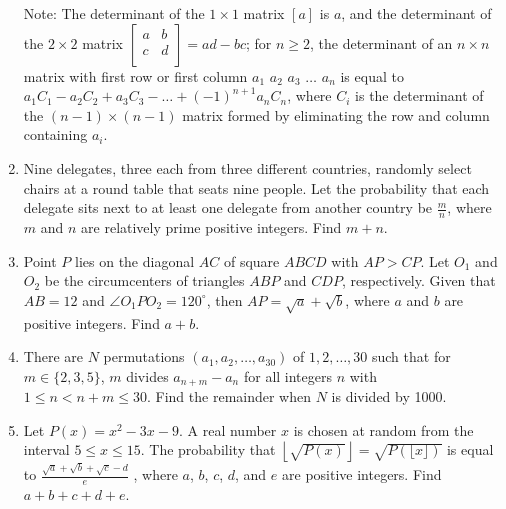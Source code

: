 \documentclass{article}
\begin{document}
\begin{enumerate}[label=\arabic*., itemsep=0.5em]
Note: The determinant of the \(1 \times 1\) matrix \([a]\) is \(a\), and the determinant of the \(2 \times 2\) matrix \(\left[ {\begin{array}{cc}
 a & b  \\
 c & d  \\
 \end{array} } \right] = ad - bc\); for \(n \ge 2\), the determinant of an \(n \times n\) matrix with first row or first column \(a_1\) \(a_2\) \(a_3\) \(\dots\) \(a_n\) is equal to \(a_1C_1 - a_2C_2 + a_3C_3 - \dots + (-1)^{n+1}a_nC_n\), where \(C_i\) is the determinant of the \((n - 1) \times (n - 1)\) matrix formed by eliminating the row and column containing \(a_i\).\par \vspace{0.5em}\item Nine delegates, three each from three different countries, randomly select chairs at a round table that seats nine people. Let the probability that each delegate sits next to at least one delegate from another country be \(\frac{m}{n}\), where \(m\) and \(n\) are relatively prime positive integers. Find \(m + n\).\par \vspace{0.5em}\item Point \(P\) lies on the diagonal \(AC\) of square \(ABCD\) with \(AP > CP\). Let \(O_1\) and \(O_2\) be the circumcenters of triangles \(ABP\) and \(CDP\), respectively. Given that \(AB = 12\) and \(\angle O_1PO_2 = 120 ^{\circ}\), then \(AP = \sqrt{a} + \sqrt{b}\), where \(a\) and \(b\) are positive integers. Find \(a + b\).\par \vspace{0.5em}\item There are \(N\) permutations \((a_1, a_2, \dots, a_{30})\) of \(1, 2, \dots, 30\) such that for \(m \in \{2,3,5\}\), \(m\) divides \(a_{n+m} - a_n\) for all integers \(n\) with \(1 \le n < n+m \le 30\). Find the remainder when \(N\) is divided by 1000.\par \vspace{0.5em}\item Let \(P(x) = x^2 - 3x - 9\). A real number \(x\) is chosen at random from the interval \(5 \le x \le 15\). The probability that \(\left\lfloor\sqrt{P(x)}\right\rfloor = \sqrt{P(\lfloor x \rfloor)}\) is equal to \(\frac{\sqrt{a} + \sqrt{b} + \sqrt{c} - d}{e}\) , where \(a\), \(b\), \(c\), \(d\), and \(e\) are positive integers. Find \(a + b + c + d + e\).\par \vspace{0.5em}\end{enumerate}
\end{document}
